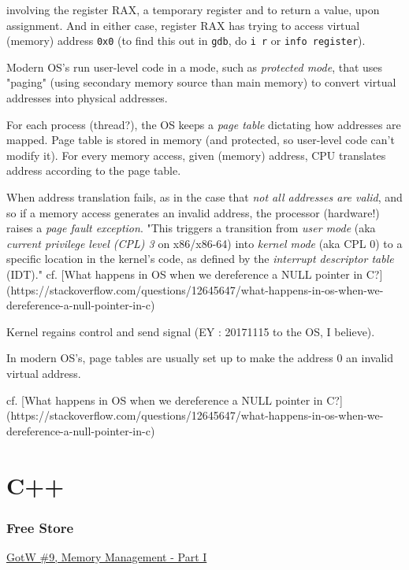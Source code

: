 \documentclass[10pt]{amsart}
\begin{document}
involving the register RAX, a temporary register and to return a value, upon assignment.  And in either case, register RAX has trying to access virtual (memory) address \verb|0x0| (to find this out in \verb|gdb|, do \verb|i r| or \verb|info register|).  

Modern OS's run user-level code in a mode, such as \emph{protected mode}, that uses "paging" (using secondary memory source than main memory) to convert virtual addresses into physical addresses.  

For each process (thread?), the OS keeps a \emph{page table} dictating how addresses are mapped.  Page table is stored in memory (and protected, so user-level code can't modify it).  For every memory access, given (memory) address, CPU translates address according to the page table.  

When address translation fails, as in the case that \emph{not all addresses are valid}, and so if a memory access generates an invalid address, the processor (hardware!) raises a \emph{page fault exception}.  "This triggers a transition from \emph{user mode} (aka \emph{current privilege level (CPL) 3} on x86/x86-64) into \emph{kernel mode} (aka CPL 0) to a specific location in the kernel's code, as defined by the \emph{interrupt descriptor table} (IDT)."  cf. [What happens in OS when we dereference a NULL pointer in C?](https://stackoverflow.com/questions/12645647/what-happens-in-os-when-we-dereference-a-null-pointer-in-c)


Kernel regains control and send signal (EY : 20171115 to the OS, I believe).   

In modern OS's, page tables are usually set up to make the address 0 an invalid virtual address.  

cf. [What happens in OS when we dereference a NULL pointer in C?](https://stackoverflow.com/questions/12645647/what-happens-in-os-when-we-dereference-a-null-pointer-in-c)

\part{C++}  

\section{Free Store}  


\href{http://www.gotw.ca/gotw/009.htm}{GotW \#9, Memory Management - Part I}
\end{document}
